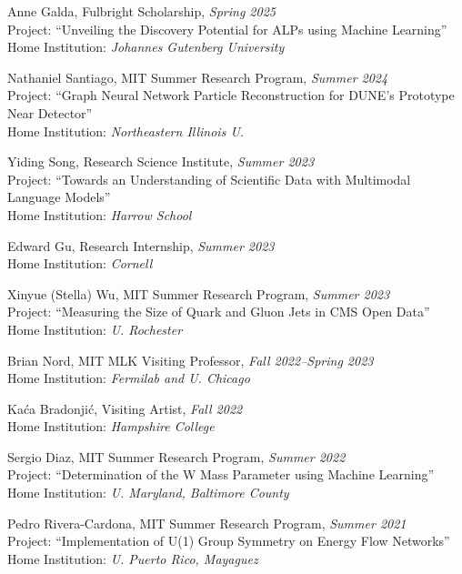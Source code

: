 \bbl

\item Anne Galda, Fulbright Scholarship, \emph{Spring 2025}
\\ Project: ``Unveiling the Discovery Potential for ALPs using Machine Learning''
\\ Home Institution: \emph{Johannes Gutenberg University}

\item Nathaniel Santiago, MIT Summer Research Program, \emph{Summer 2024}
\\ Project: ``Graph Neural Network Particle Reconstruction for DUNE's Prototype Near Detector''
\\ Home Institution: \emph{Northeastern Illinois U.}

\item Yiding Song, Research Science Institute, \emph{Summer 2023}
\\ Project: ``Towards an Understanding of Scientific Data with Multimodal Language Models''
\\ Home Institution: \emph{Harrow School}

\item Edward Gu, Research Internship, \emph{Summer 2023}
\\ Home Institution: \emph{Cornell}

\item Xinyue (Stella) Wu, MIT Summer Research Program, \emph{Summer 2023}
\\ Project: ``Measuring the Size of Quark and Gluon Jets in CMS Open Data''
\\ Home Institution: \emph{U. Rochester}

\item Brian Nord, MIT MLK Visiting Professor, \emph{Fall 2022--Spring 2023}
\\ Home Institution: \emph{Fermilab and U. Chicago}

\item Kaća Bradonjić, Visiting Artist, \emph{Fall 2022}
\\ Home Institution: \emph{Hampshire College}

\item Sergio Diaz, MIT Summer Research Program, \emph{Summer 2022}
\\ Project: ``Determination of the W Mass Parameter using Machine Learning''
\\ Home Institution: \emph{U. Maryland, Baltimore County}

\item Pedro Rivera-Cardona, MIT Summer Research Program, \emph{Summer 2021}
\\ Project: ``Implementation of U(1) Group Symmetry on Energy Flow Networks''
\\ Home Institution: \emph{U. Puerto Rico, Mayaguez}

